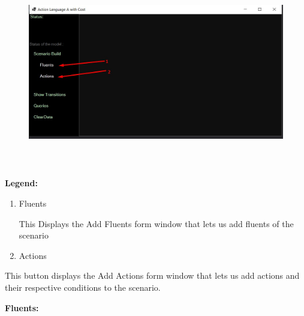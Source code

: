 \documentclass[12pt]{article}
\begin{document}

\begin{figure}[H]
	\begin{Center}
		\includegraphics[width=6.26in,height=3.28in]{./media/image4.jpeg}
	\end{Center}
\end{figure}



\par


\vspace{\baselineskip}
\textbf{Legend:}\par


\vspace{\baselineskip}
\begin{enumerate}
	\item Fluents\tab \par

\tab This Displays the Add Fluents form window that lets us add fluents of the scenario\par


\vspace{\baselineskip}
	\item Actions
\end{enumerate}\par

\tab This button displays the Add Actions form window that lets us add actions and their \tab respective conditions to the scenario.\par


\vspace{\baselineskip}
\textbf{Fluents:}\par
\end{document}
